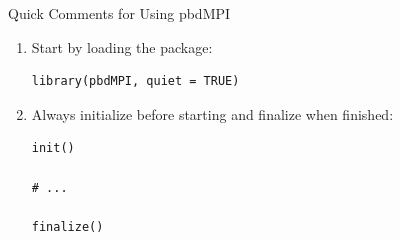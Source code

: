 \begin{frame}[fragile]
  \begin{block}{Quick Comments for Using pbdMPI}\pause
    \begin{enumerate}
      \item Start by loading the package:
\vspace{-.4cm}
\begin{lstlisting}
library(pbdMPI, quiet = TRUE)
\end{lstlisting}
      \item Always initialize before starting and finalize when finished:
\vspace{-.4cm}
\begin{lstlisting}
init()

# ...

finalize()
\end{lstlisting}
\end{enumerate}
\end{block}
\end{frame}